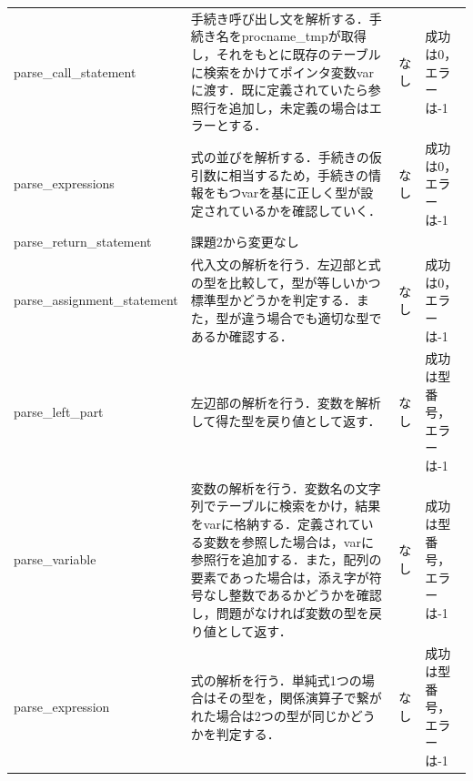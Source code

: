\documentclass{jlreq}
\begin{document}
\begin{table}[H]
{\begin{tabular}{|l|p{15cm}|l|p{6cm}|}
      parse\_call\_statement          & 手続き呼び出し文を解析する．手続き名をprocname\_tmpが取得し，それをもとに既存のテーブルに検索をかけてポインタ変数varに渡す．既に定義されていたら参照行を追加し，未定義の場合はエラーとする．                                                                   & なし & 成功は0，エラーは-1                \\
      parse\_expressions              & 式の並びを解析する．手続きの仮引数に相当するため，手続きの情報をもつvarを基に正しく型が設定されているかを確認していく．                                                                                                                                        & なし & 成功は0，エラーは-1                \\
      parse\_return\_statement        & 課題2から変更なし                                                                                                                                                                                                                                              & ~    & ~                                  \\
      parse\_assignment\_statement    & 代入文の解析を行う．左辺部と式の型を比較して，型が等しいかつ標準型かどうかを判定する．また，型が違う場合でも適切な型であるか確認する．                                                                                                                         & なし & 成功は0，エラーは-1                \\
      parse\_left\_part               & 左辺部の解析を行う．変数を解析して得た型を戻り値として返す．                                                                                                                                                                                                   & なし & 成功は型番号，エラーは-1           \\
      parse\_variable                 & 変数の解析を行う．変数名の文字列でテーブルに検索をかけ，結果をvarに格納する．定義されている変数を参照した場合は，varに参照行を追加する．また，配列の要素であった場合は，添え字が符号なし整数であるかどうかを確認し，問題がなければ変数の型を戻り値として返す． & なし & 成功は型番号，エラーは-1           \\
      parse\_expression               & 式の解析を行う．単純式1つの場合はその型を，関係演算子で繋がれた場合は2つの型が同じかどうかを判定する．                                                                                                                                                         & なし & 成功は型番号，エラーは-1           \\

\end{tabular}}
\end{table}
\end{document}
